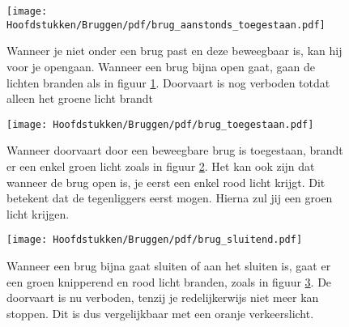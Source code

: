 \vspace{-0.75cm}
\begin{figure}[H]
	\centering
	\begin{minipage}[b]{0.18\textwidth}
		\texttt{[image: Hoofdstukken/Bruggen/pdf/brug\_aanstonds\_toegestaan.pdf]}
		\caption{}
		\label{pic:brug:aanstonds}
	\end{minipage}
	\hfill
	\begin{minipage}[t]{0.75\textwidth}
		\vspace{-2.5cm}
		Wanneer je niet onder een brug past en deze beweegbaar is, kan hij voor je opengaan. Wanneer een brug bijna open gaat, gaan de lichten branden als in figuur \ref{pic:brug:aanstonds}. Doorvaart is nog verboden totdat alleen het groene licht brandt
	\end{minipage}
\end{figure}
\vspace{-0.75cm}
\begin{figure}[H]
	\centering
	\begin{minipage}[b]{0.18\textwidth}
		\texttt{[image: Hoofdstukken/Bruggen/pdf/brug\_toegestaan.pdf]}
		\caption{}
		\label{pic:brug:vrij}
	\end{minipage}
	\hfill
	\begin{minipage}[t]{0.75\textwidth}
		\vspace{-2.5cm}
		Wanneer doorvaart door een beweegbare brug is toegestaan, brandt er een enkel groen licht zoals in figuur \ref{pic:brug:vrij}. Het kan ook zijn dat wanneer de brug open is, je eerst een enkel rood licht krijgt. Dit betekent dat de tegenliggers eerst mogen. Hierna zul jij een groen licht krijgen.
	\end{minipage}
\end{figure}
\vspace{-0.75cm}
\begin{figure}[H]
	\centering
	\begin{minipage}[b]{0.18\textwidth}
		\texttt{[image: Hoofdstukken/Bruggen/pdf/brug\_sluitend.pdf]}
		\caption{}
		\label{pic:brug:sluitend}
	\end{minipage}
	\hfill
	\begin{minipage}[t]{0.75\textwidth}
		\vspace{-2.5cm}
		Wanneer een brug bijna gaat sluiten of aan het sluiten is, gaat er een groen knipperend en rood licht branden, zoals in figuur \ref{pic:brug:sluitend}. De doorvaart is nu verboden, tenzij je redelijkerwijs niet meer kan stoppen. Dit is dus vergelijkbaar met een oranje verkeerslicht.
	\end{minipage}
\end{figure}
